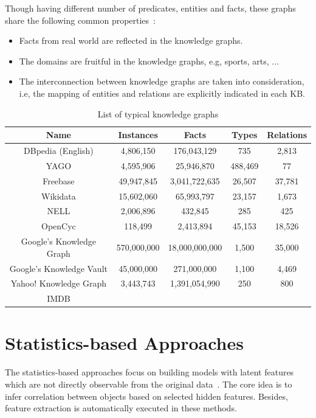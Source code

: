 Though having different number of predicates, entities and facts, these graphs share the following common properties~\cite{ref27}:

\begin{itemize}
\item Facts from real world are reflected in the knowledge graphs.
\item The domains are fruitful in the knowledge graphs, e.g, sports, arts, ...
\item The interconnection between knowledge graphs are taken into consideration, i.e, the mapping of entities and relations are explicitly indicated in each KB.
\end{itemize}

\begin{table}
\begin{center}
\begin{tabular}{|c|c|c|c|c|}
\hline
Name & Instances & Facts & Types & Relations\\
\hline\hline
DBpedia (English) & 4,806,150 & 176,043,129 & 735 & 2,813\\
\hline
YAGO & 4,595,906 & 25,946,870 & 488,469 & 77\\
\hline
Freebase & 49,947,845 & 3,041,722,635 & 26,507 & 37,781\\
\hline
Wikidata & 15,602,060 & 65,993,797 & 23,157 & 1,673\\
\hline
NELL & 2,006,896 & 432,845 & 285 & 425\\
\hline
OpenCyc & 118,499 & 2,413,894 & 45,153 & 18,526\\
\hline
Google's Knowledge Graph & 570,000,000 & 18,000,000,000 & 1,500 & 35,000\\
\hline
Google's Knowledge Vault & 45,000,000 & 271,000,000 & 1,100 & 4,469\\
\hline
Yahoo! Knowledge Graph & 3,443,743 & 1,391,054,990 & 250 & 800\\
\hline
IMDB & & & & \\
\hline
\end{tabular}
\end{center}
\caption{List of typical knowledge graphs}
\label{table1}
\end{table}

\section{Statistics-based Approaches}

The statistics-based approaches focus on building models with latent features which are not directly observable from the original data~\cite{ref1}. The core idea is to infer correlation between objects based on selected hidden features. Besides, feature extraction is automatically executed in these methods.

